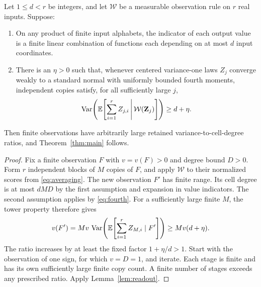 \begin{proposition}\label{prop:amplification}
Let \(1\le d<r\) be integers, and let \(\mathcal W\) be a measurable
observation rule on \(r\) real inputs. Suppose:
\begin{enumerate}
\item On any product of finite input alphabets, the indicator of each
output value is a finite linear combination of functions each depending
on at most \(d\) input coordinates.
\item There is an \(\eta>0\) such that, whenever centered variance-one
laws \(Z_j\) converge weakly to a standard normal with uniformly bounded
fourth moments, independent copies satisfy, for all sufficiently large \(j\),
\[
 \operatorname{Var}\!\left(\mathbb E\!\left[\sum_{i=1}^r Z_{j,i}\,\middle|\,
                \mathcal W(\mathbf Z_j)\right]\right)\ge d+\eta.
\]
\end{enumerate}
Then finite observations have arbitrarily large retained
variance-to-cell-degree ratios, and Theorem~\ref{thm:main} follows.
\end{proposition}

\begin{proof}
Fix a finite observation \(F\) with \(v=v(F)>0\) and degree bound \(D>0\).
Form \(r\) independent blocks of \(M\) copies of \(F\), and apply
\(\mathcal W\) to their normalized scores from \eqref{eq:averaging}.
The new observation \(F'\) has finite range. Its cell degree is at most
\(dMD\) by the first assumption and expansion in value indicators.
The second assumption applies by \eqref{eq:fourth}. For a sufficiently
large finite \(M\), the tower property therefore gives
\[
 v(F')=Mv\,\operatorname{Var}\!\left(\mathbb E\!\left[\sum_{i=1}^rZ_{M,i}\mid F'\right]\right)
 \ge Mv(d+\eta).
\]
The ratio increases by at least the fixed factor \(1+\eta/d>1\).
Start with the observation of one sign, for which \(v=D=1\), and
iterate. Each stage is finite and has its own sufficiently large finite
copy count. A finite number of stages exceeds any prescribed ratio.
Apply Lemma~\ref{lem:readout}.
\end{proof}
